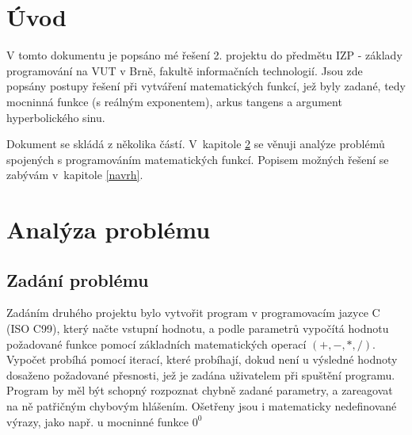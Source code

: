 \documentclass[12pt,a4paper,titlepage,final]{article}
\begin{document}

\def\author{Roman Blanco}
\def\email{xblanc01X@stud.fit.vutbr.cz}
\def\projname{Iterační výpočty}



\pagestyle{plain}
\tableofcontents
\setcounter{page}{1}
\newpage
\pagestyle{plain}
\setcounter{page}{2}

\section{Úvod} \label{uvod}

V tomto dokumentu je popsáno mé řešení 2. projektu do předmětu IZP - základy
programování na VUT v Brně, fakultě informačních technologií.
Jsou zde popsány postupy řešení při vytváření matematických funkcí, jež byly
zadané, tedy mocninná funkce (s reálným exponentem), arkus tangens a argument 
hyperbolického sinu.

Dokument se skládá z několika částí. V~kapitole \ref{analyza} se věnuji 
analýze problémů spojených s programováním matematických funkcí. Popisem
možných řešení se zabývám v~kapitole \ref{navrh}.

\section{Analýza problému} \label{analyza}

\subsection{Zadání problému}

Zadáním druhého projektu bylo vytvořit program v programovacím jazyce C 
(ISO C99), který načte vstupní hodnotu, a podle parametrů vypočítá hodnotu 
požadované funkce pomocí základ\-ních matematických operací $(+, -, *, /)$. 
Vypočet probíhá pomocí iterací, které probíhají, dokud není u výsledné hodnoty
dosaženo požadované přesnosti, jež je zadána uživatelem při spuštění programu.
Program by měl být schopný rozpoznat chybně zadané parametry, a zareagovat na
ně patřičným chybovým hlášením. Ošetřeny jsou i matematicky nedefinované 
výrazy, jako např. u mocninné funkce $0^0$
\end{document}
